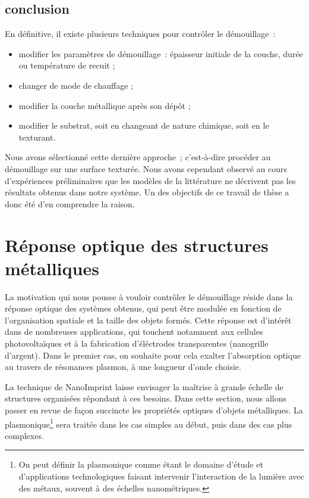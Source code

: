 \subsection{conclusion}
En définitive, il existe plusieurs techniques pour contrôler le démouillage~:
\begin{itemize}
\item modifier les paramètres de démouillage~: épaisseur initiale de la couche, durée ou température
de recuit ;
\item changer de mode de chauffage ;
\item modifier la couche métallique après son dépôt ;
\item modifier le substrat, soit en changeant de nature chimique, soit en le texturant.
\end{itemize}
Nous avons sélectionné cette dernière approche~; c'est-à-dire procéder au démouillage sur une surface texturée. Nous avons cependant observé au cours d'expériences préliminaires que les modèles de la littérature ne décrivent pas les résultats obtenus dans notre système. Un des objectifs de ce travail de thèse a donc été d'en comprendre la raison.\par

\section{Réponse optique des structures métalliques}
La motivation qui nous pousse à vouloir contrôler le démouillage réside dans la réponse optique des systèmes obtenus, qui peut être modulée en fonction de l'organisation spatiale et la taille des objets formés. Cette réponse est d'intérêt dans de nombreuses applications, qui touchent notamment aux cellules photovoltaïques et à la fabrication d'éléctrodes transparentes (nanogrille d'argent). Dans le premier cas, on souhaite pour cela exalter l'absorption optique au travers de résonances plasmon, à une longueur d'onde choisie.\par 
La technique de NanoImprint laisse envisager la maîtrise à grande échelle de structures organisées répondant à ces besoins. 
Dans cette section, nous allons passer en revue de façon succincte les propriétés optiques d'objets métalliques.  La \og plasmonique\footnote{On peut définir la plasmonique comme étant le domaine d'étude et d'applications technologiques faisant intervenir l'interaction de la lumière avec des métaux, souvent à des échelles nanométriques.} \fg{} sera traitée dans les cas simples au début, puis dans des cas plus complexes. \par 
